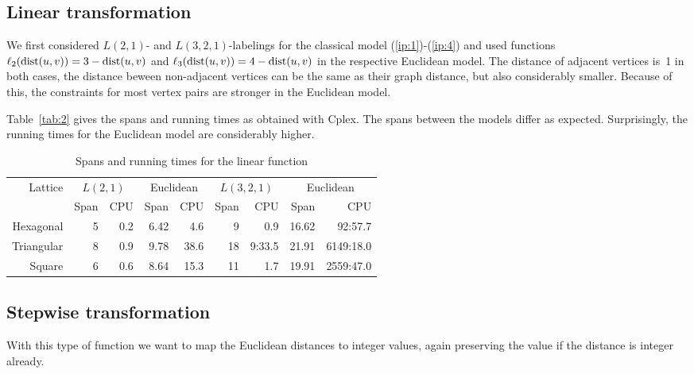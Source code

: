\documentclass[smallextended]{svjour3}
\def\dist{\mathop{\rm dist}}
\begin{document}
\subsection{Linear transformation} 

We first considered $L(2,1)$- and $L(3,2,1)$-labelings for the classical model (\ref{ip:1})-(\ref{ip:4}) and used functions $\ell_{2}(\dist(u,v))=3-\dist(u,v)$ and $\ell_{3}(\dist(u,v))=4-\dist(u,v)$ 
in the respective Euclidean model. 
The distance of adjacent vertices is~1 in both cases, 
the distance beween non-adjacent vertices can be the same as their graph distance, 
but also considerably smaller. Because of this, the constraints for most vertex 
pairs are stronger in the Euclidean model. 

\noindent 
Table~\ref{tab:2} gives the spans and running times as obtained with Cplex. 
The spans between the models differ as expected. 
Surprisingly, the running times for the Euclidean model are considerably higher. 

\begin{table}[h] 
\begin{center} 
\renewcommand{\arraystretch}{1.3} 
\renewcommand{\tabcolsep}{8pt} 
\begin{tabular}{|r||r|r|r|r||r|r|r|r|} 
\hline 
Lattice  & \multicolumn{2}{c|}{$L(2,1)$} & \multicolumn{2}{c||}{Euclidean} & 
 \multicolumn{2}{c|}{$L(3,2,1)$} & \multicolumn{2}{c|}{Euclidean}\\ 
  & Span & CPU & Span & CPU & Span & CPU & Span & CPU\\ 
\hline 
Hexagonal   & 5 & 0.2 & 6.42 & 4.6 & 9 & 0.9& 16.62 & 92:57.7 \\ 
\hline 
Triangular  & 8 & 0.9 & 9.78 & 38.6 & 18 & 9:33.5& 21.91 & 6149:18.0 \\ 
\hline 
Square     & 6 & 0.6 & 8.64  & 15.3 & 11 & 1.7 & 19.91 & 2559:47.0  \\ 
\hline 
\end{tabular} 
\end{center} 
\caption{Spans and running times for the linear function} 
\label{tab:1} 
\end{table} 

\subsection{Stepwise transformation} 

With this type of function we want to map the Euclidean distances to integer 
values, again preserving the value if the distance is integer already. 
\end{document}
